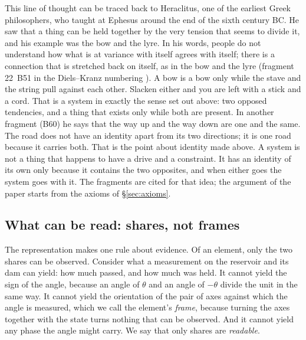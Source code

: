 \documentclass[11pt,a4paper]{article}
\theoremstyle{plain}
\theoremstyle{definition}
\theoremstyle{remark}
\begin{document}
This line of thought can be traced back to Heraclitus, one of the earliest Greek philosophers, who taught at Ephesus around the end of the sixth century BC. He saw that a thing can be held together by the very tension that seems to divide it, and his example was the bow and the lyre. In his words, people do not understand how what is at variance with itself agrees with itself; there is a connection that is stretched back on itself, as in the bow and the lyre (fragment 22~B51 in the Diels--Kranz numbering \cite{krs}). A bow is a bow only while the stave and the string pull against each other. Slacken either and you are left with a stick and a cord. That is a system in exactly the sense set out above: two opposed tendencies, and a thing that exists only while both are present. In another fragment (B60) he says that the way up and the way down are one and the same. The road does not have an identity apart from its two directions; it is one road because it carries both. That is the point about identity made above. A system is not a thing that happens to have a drive and a constraint. It has an identity of its own only because it contains the two opposites, and when either goes the system goes with it. The fragments are cited for that idea; the argument of the paper starts from the axioms of \S\ref{sec:axioms}.

\subsection{What can be read: shares, not frames}

The representation makes one rule about evidence. Of an element, only the two shares can be observed. Consider what a measurement on the reservoir and its dam can yield: how much passed, and how much was held. It cannot yield the sign of the angle, because an angle of $\theta$ and an angle of $-\theta$ divide the unit in the same way. It cannot yield the orientation of the pair of axes against which the angle is measured, which we call the element's \emph{frame}, because turning the axes together with the state turns nothing that can be observed. And it cannot yield any phase the angle might carry. We say that only shares are \emph{readable}.
\end{document}
